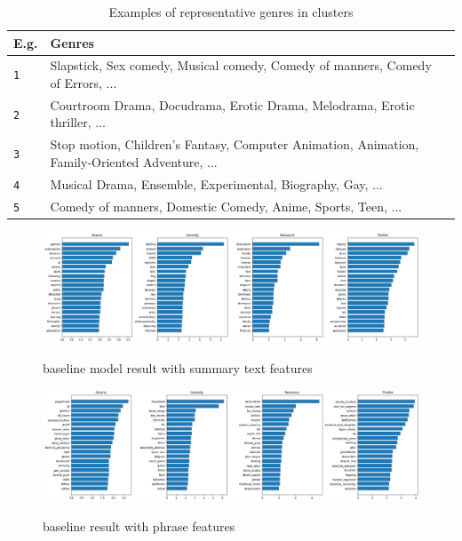\documentclass{article}
\begin{document}
\begin{multicols}{2}
\begin{table}
\caption{Examples of representative genres in clusters}
\centering
\begin{tabularx}{.8\textwidth}{llX}
    \textbf{E.g.} & \textbf{Genres} \\
    \hline
    \texttt 1 & Slapstick, Sex comedy, Musical comedy, Comedy of manners, Comedy of Errors, ...\\
    \texttt 2 & Courtroom Drama, Docudrama, Erotic Drama, Melodrama, Erotic thriller, ...\\
    \texttt 3 & Stop motion, Children's Fantasy, Computer Animation, Animation, Family-Oriented Adventure, ...\\
    \texttt 4 & Musical Drama, Ensemble, Experimental, Biography, Gay, ...\\
    \texttt 5 & Comedy of manners, Domestic Comedy, Anime, Sports, Teen, ...\\
\end{tabularx}
\label{table:cluster_rep_genres}
\end{table}

 \begin{figure}
\caption{baseline model result with summary text features}
\centering
\includegraphics[width=5in]{figures/baseline - summary text.png}
\label{figure:classification with summary text baseline}
\end{figure}

\begin{figure}
\caption{baseline result with phrase features}
\centering
\includegraphics[width=5in]{figures/baseline - phrases.png}
\label{figure:classification with phrase baseline}
\end{figure}

\end{multicols}
\end{document}

